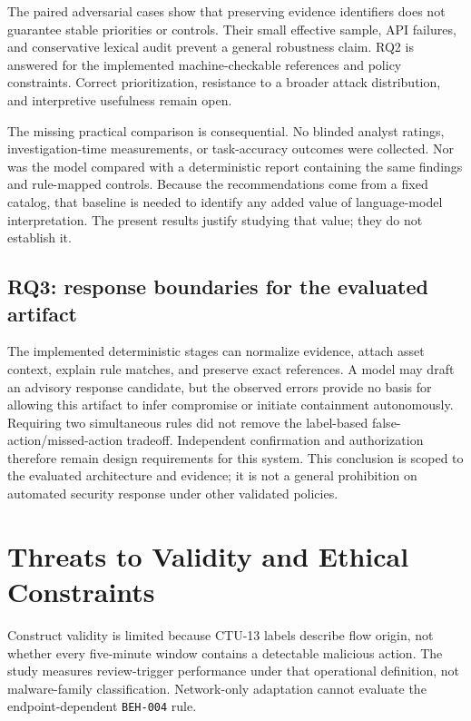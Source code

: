 \documentclass[11pt,a4paper,onecolumn]{IEEEtran}
\begin{document}
The paired adversarial cases show that preserving evidence identifiers does not guarantee stable priorities or controls. Their small effective sample, API failures, and conservative lexical audit prevent a general robustness claim. RQ2 is answered for the implemented machine-checkable references and policy constraints. Correct prioritization, resistance to a broader attack distribution, and interpretive usefulness remain open.

The missing practical comparison is consequential. No blinded analyst ratings, investigation-time measurements, or task-accuracy outcomes were collected. Nor was the model compared with a deterministic report containing the same findings and rule-mapped controls. Because the recommendations come from a fixed catalog, that baseline is needed to identify any added value of language-model interpretation. The present results justify studying that value; they do not establish it.

\subsection{RQ3: response boundaries for the evaluated artifact}

The implemented deterministic stages can normalize evidence, attach asset context, explain rule matches, and preserve exact references. A model may draft an advisory response candidate, but the observed errors provide no basis for allowing this artifact to infer compromise or initiate containment autonomously. Requiring two simultaneous rules did not remove the label-based false-action/missed-action tradeoff. Independent confirmation and authorization therefore remain design requirements for this system. This conclusion is scoped to the evaluated architecture and evidence; it is not a general prohibition on automated security response under other validated policies.

\section{Threats to Validity and Ethical Constraints}

Construct validity is limited because CTU-13 labels describe flow origin, not whether every five-minute window contains a detectable malicious action. The study measures review-trigger performance under that operational definition, not malware-family classification. Network-only adaptation cannot evaluate the endpoint-dependent \texttt{BEH-004} rule.
\end{document}

